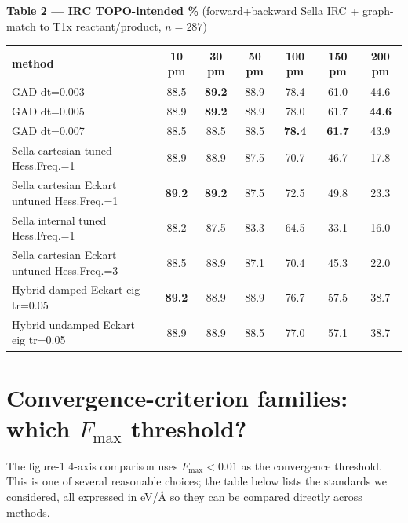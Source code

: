 \documentclass[11pt]{article}
\begin{document}
\begin{center}\footnotesize
\textbf{Table 2 — IRC TOPO-intended \%} (forward+backward Sella IRC + graph-match to T1x reactant/product, $n=287$)\\[0.3em]
\begin{tabular}{l|cccccc}
\toprule
\textbf{method} & \textbf{10 pm} & \textbf{30 pm} & \textbf{50 pm} & \textbf{100 pm} & \textbf{150 pm} & \textbf{200 pm} \\
\midrule
GAD dt=0.003                                & 88.5 & \textbf{89.2} & 88.9 & 78.4 & 61.0 & 44.6 \\
GAD dt=0.005                                & 88.9 & \textbf{89.2} & 88.9 & 78.0 & 61.7 & \textbf{44.6} \\
GAD dt=0.007                                & 88.5 & 88.5 & 88.5 & \textbf{78.4} & \textbf{61.7} & 43.9 \\
\midrule
Sella cartesian tuned Hess.Freq.=1          & 88.9 & 88.9 & 87.5 & 70.7 & 46.7 & 17.8 \\
Sella cartesian Eckart untuned Hess.Freq.=1 & \textbf{89.2} & \textbf{89.2} & 87.5 & 72.5 & 49.8 & 23.3 \\
Sella internal tuned Hess.Freq.=1           & 88.2 & 87.5 & 83.3 & 64.5 & 33.1 & 16.0 \\
Sella cartesian Eckart untuned Hess.Freq.=3 & 88.5 & 88.9 & 87.1 & 70.4 & 45.3 & 22.0 \\
\midrule
Hybrid damped Eckart eig tr=0.05            & \textbf{89.2} & 88.9 & 88.9 & 76.7 & 57.5 & 38.7 \\
Hybrid undamped Eckart eig tr=0.05          & 88.9 & 88.9 & 88.5 & 77.0 & 57.1 & 38.7 \\
\bottomrule
\end{tabular}
\end{center}

\clearpage
\section{Convergence-criterion families: which $F_\mathrm{max}$ threshold?}
\label{sec:thresholds}

The figure-1 4-axis comparison uses $F_\mathrm{max}<0.01$ as the convergence
threshold. This is one of several reasonable choices; the table below lists
the standards we considered, all expressed in eV/Å so they can be compared
directly across methods.
\end{document}
